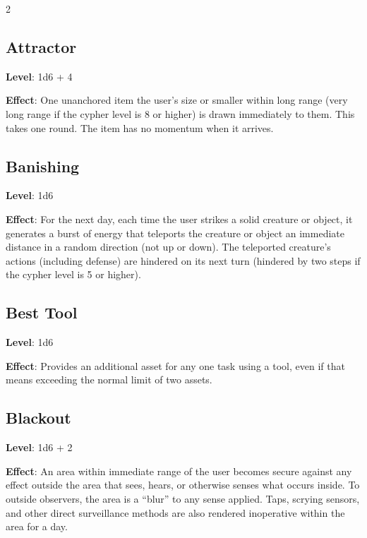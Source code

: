 \begin{multicols}{2}

\subsection{Attractor}

\textbf{Level}: 1d6 + 4

\textbf{Effect}: One unanchored item the user’s size or smaller within long range (very long range if the cypher level is 8 or higher) is drawn immediately to them. This takes one round. The item has no momentum when it arrives.

\subsection{Banishing}

\textbf{Level}: 1d6

\textbf{Effect}: For the next day, each time the user strikes a solid creature or object, it generates a burst of energy that teleports the creature or object an immediate distance in a random direction (not up or down). The teleported creature’s actions (including defense) are hindered on its next turn (hindered by two steps if the cypher level is 5 or higher).

\subsection{Best Tool}

\textbf{Level}: 1d6

\textbf{Effect}: Provides an additional asset for any one task using a tool, even if that means exceeding the normal limit of two assets. 

\subsection{Blackout}

\textbf{Level}: 1d6 + 2

\textbf{Effect}: An area within immediate range of the user becomes secure against any effect outside the area that sees, hears, or otherwise senses what occurs inside. To outside observers, the area is a “blur” to any sense applied. Taps, scrying sensors, and other direct surveillance methods are also rendered inoperative within the area for a day.


\end{multicols}
